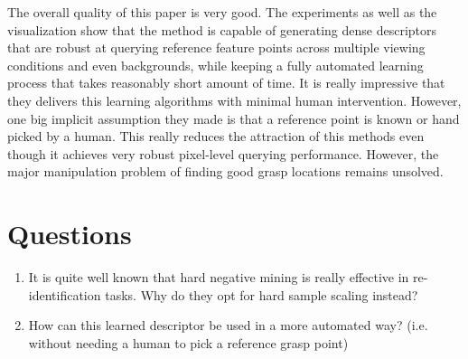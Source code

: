 \documentclass[10pt, twocolumn]{article}
\begin{document}
The overall quality of this paper is very good. The experiments as well as the
visualization show that the method is capable of generating dense descriptors
that are robust at querying reference feature points across multiple viewing
conditions and even backgrounds, while keeping a fully automated learning process
that takes reasonably short amount of time. It is really impressive that they
delivers this learning algorithms with minimal human intervention. However, one
big implicit assumption they made is that a reference point is known or hand
picked by a human. This really reduces the attraction of this methods even though
it achieves very robust pixel-level querying performance. However, the major
manipulation problem of finding good grasp locations remains unsolved.

\section{Questions}
\begin{enumerate}
  \item It is quite well known that hard negative mining is really effective in
    re-identification tasks. Why do they opt for hard sample scaling instead?

  \item How can this learned descriptor be used in a more automated way? (i.e.
    without needing a human to pick a reference grasp point)
\end{enumerate}
\end{document}
